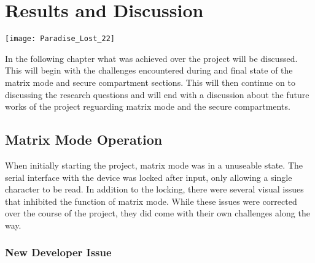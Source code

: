 
\chapter{Results and Discussion} %

\texttt{[image: Paradise\_Lost\_22]}

\label{Chapter 7} %

In the following chapter what was achieved over the project will be discussed. This will begin with the challenges encountered during and final state of the matrix mode and secure compartment sections. This will then continue on to discussing the research questions and will end with a discussion about the future works of the project reguarding matrix mode and the secure compartments.


\section{Matrix Mode Operation}

\label{Ch7 Sec1}

When initially starting the project, matrix mode was in a unuseable state. The serial interface with the device was locked after input, only allowing a single character to be read. In addition to the locking, there were several visual issues that inhibited the function of matrix mode. While these issues were corrected over the course of the project, they did come with their own challenges along the way. 

\subsection{New Developer Issue}

\label{Ch7 Sec1 Sub1}

